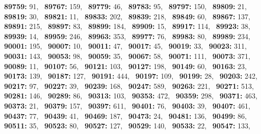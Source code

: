 \textbf{89759:} 91,\allowbreak~ 
\textbf{89767:} 159,\allowbreak~ 
\textbf{89779:} 46,\allowbreak~ 
\textbf{89783:} 95,\allowbreak~ 
\textbf{89797:} 150,\allowbreak~ 
\textbf{89809:} 21,\allowbreak~ 
\textbf{89819:} 30,\allowbreak~ 
\textbf{89821:} 11,\allowbreak~ 
\textbf{89833:} 202,\allowbreak~ 
\textbf{89839:} 218,\allowbreak~ 
\textbf{89849:} 60,\allowbreak~ 
\textbf{89867:} 137,\allowbreak~ 
\textbf{89891:} 215,\allowbreak~ 
\textbf{89897:} 83,\allowbreak~ 
\textbf{89899:} 184,\allowbreak~ 
\textbf{89909:} 15,\allowbreak~ 
\textbf{89917:} 114,\allowbreak~ 
\textbf{89923:} 38,\allowbreak~ 
\textbf{89939:} 14,\allowbreak~ 
\textbf{89959:} 246,\allowbreak~ 
\textbf{89963:} 353,\allowbreak~ 
\textbf{89977:} 76,\allowbreak~ 
\textbf{89983:} 80,\allowbreak~ 
\textbf{89989:} 234,\allowbreak~ 
\textbf{90001:} 195,\allowbreak~ 
\textbf{90007:} 10,\allowbreak~ 
\textbf{90011:} 47,\allowbreak~ 
\textbf{90017:} 45,\allowbreak~ 
\textbf{90019:} 33,\allowbreak~ 
\textbf{90023:} 311,\allowbreak~ 
\textbf{90031:} 143,\allowbreak~ 
\textbf{90053:} 98,\allowbreak~ 
\textbf{90059:} 35,\allowbreak~ 
\textbf{90067:} 58,\allowbreak~ 
\textbf{90071:} 111,\allowbreak~ 
\textbf{90073:} 371,\allowbreak~ 
\textbf{90089:} 11,\allowbreak~ 
\textbf{90107:} 56,\allowbreak~ 
\textbf{90121:} 103,\allowbreak~ 
\textbf{90127:} 198,\allowbreak~ 
\textbf{90149:} 60,\allowbreak~ 
\textbf{90163:} 23,\allowbreak~ 
\textbf{90173:} 139,\allowbreak~ 
\textbf{90187:} 127,\allowbreak~ 
\textbf{90191:} 444,\allowbreak~ 
\textbf{90197:} 109,\allowbreak~ 
\textbf{90199:} 28,\allowbreak~ 
\textbf{90203:} 242,\allowbreak~ 
\textbf{90217:} 97,\allowbreak~ 
\textbf{90227:} 39,\allowbreak~ 
\textbf{90239:} 168,\allowbreak~ 
\textbf{90247:} 589,\allowbreak~ 
\textbf{90263:} 221,\allowbreak~ 
\textbf{90271:} 513,\allowbreak~ 
\textbf{90281:} 146,\allowbreak~ 
\textbf{90289:} 86,\allowbreak~ 
\textbf{90313:} 103,\allowbreak~ 
\textbf{90353:} 472,\allowbreak~ 
\textbf{90359:} 298,\allowbreak~ 
\textbf{90371:} 463,\allowbreak~ 
\textbf{90373:} 21,\allowbreak~ 
\textbf{90379:} 157,\allowbreak~ 
\textbf{90397:} 611,\allowbreak~ 
\textbf{90401:} 76,\allowbreak~ 
\textbf{90403:} 39,\allowbreak~ 
\textbf{90407:} 461,\allowbreak~ 
\textbf{90437:} 77,\allowbreak~ 
\textbf{90439:} 41,\allowbreak~ 
\textbf{90469:} 187,\allowbreak~ 
\textbf{90473:} 24,\allowbreak~ 
\textbf{90481:} 136,\allowbreak~ 
\textbf{90499:} 86,\allowbreak~ 
\textbf{90511:} 35,\allowbreak~ 
\textbf{90523:} 80,\allowbreak~ 
\textbf{90527:} 127,\allowbreak~ 
\textbf{90529:} 140,\allowbreak~ 
\textbf{90533:} 22,\allowbreak~ 
\textbf{90547:} 133,\allowbreak~ 
